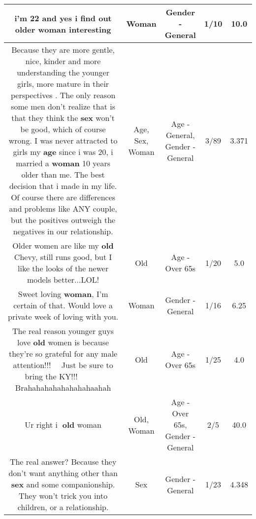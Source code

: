 \documentclass[11pt]{article}
\newlength\mylength
\begin{document}
\begin{center}
\begin{longtable}{|C{.65\mylength}|C{.30\mylength}|C{.12\mylength}|C{.12\mylength}|C{.12\mylength}|}
  \small i'm 22 and yes i find out older \textbf{woman} interesting\normalsize   & Woman & Gender - General & 1/10 & 10.0 \\  \hline
  \small Because they are more gentle, nice, kinder and more understanding the younger girls, more mature in their perspectives . The only reason some men don't realize that is that they think the \textbf{sex} won't be good, which of course wrong. I was never attracted to girls my \textbf{age} since i was 20, i married a \textbf{woman} 10 years older than me. The best decision that i made in my life. Of course there are differences and problems like ANY couple, but the positives outweigh the negatives in our relationship.\normalsize   & Age, Sex, Woman & Age - General, Gender - General & 3/89 & 3.371 \\  \hline
  \small Older women are like my \textbf{old} Chevy, still runs good, but I like the looks of the newer models better...LOL!\normalsize   & Old & Age - Over 65s & 1/20 & 5.0 \\  \hline
  \small Sweet loving \textbf{woman}, I'm certain of that. Would love a private week of loving with you.\normalsize   & Woman & Gender - General & 1/16 & 6.25 \\  \hline
  \small The real reason younger guys love \textbf{old} women is because they're so grateful for any male attention!!!   Just be sure to bring the KY!!!       Brahahahahahahahahaahah\normalsize   & Old & Age - Over 65s & 1/25 & 4.0 \\  \hline
  \small Ur right i💙 \textbf{old} woman\normalsize   & Old, Woman & Age - Over 65s, Gender - General & 2/5 & 40.0 \\  \hline
  \small The real answer? Because they don't want anything other than \textbf{sex} and some companionship. They won't trick you into children, or a relationship.\normalsize   & Sex & Gender - General & 1/23 & 4.348 \\  \hline

\end{longtable}
\end{center}
\end{document}
